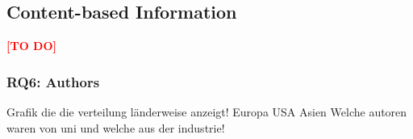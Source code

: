 
\subsection{Content-based Information}
\label{subsec:ContentBasedInformation}
\textcolor{red}{\textbf{[TO DO]}}


\clearpage
\subsubsection{RQ6: Authors}

Grafik die die verteilung länderweise anzeigt! Europa USA Asien
Welche autoren waren von uni und welche aus der industrie!
\clearpage

